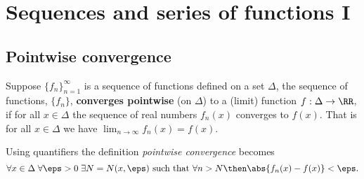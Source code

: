\documentclass[12pt, a4paper]{article}
\begin{document}


\section{Sequences and series of functions I}

\subsection{Pointwise convergence}

\begin{definition}
    Suppose \(\{f_n\}_{n=1}^{\infty}\) is a sequence of functions defined on a set \(\Delta\), the sequence of functions, \(\{f_n\}\), \textbf{converges pointwise} (on \(\Delta\)) to a (limit) function \(f : \Delta \to \RR\), if for all \(x \in \Delta\) the sequence of real numbers \(f_n(x)\) converges to \(f(x)\). That is for all \(x\in \Delta\) we have \(\lim_{n\to \infty} f_n(x) =f(x)\).
\end{definition}

\begin{mdremark}
    Using quantifiers the definition \textit{pointwise convergence} becomes
    \[\forall x \in \Delta \; \forall \eps>0  \; \exists N=N(x,\eps) \text{ such that } \forall n>N \then \abs{f_n(x)-f(x)}<\eps.\]
\end{mdremark}
\end{document}
